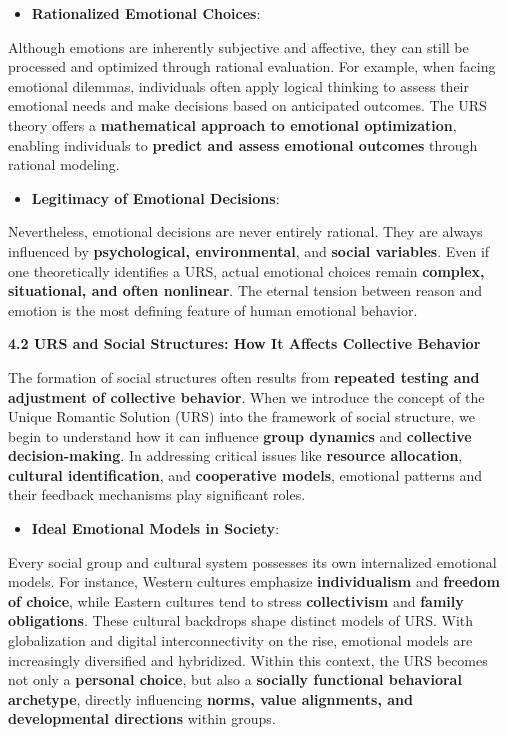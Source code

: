 \documentclass[a4paper]{article}
\begin{document}
\begin{itemize}[series=listWWNumix,label=[F0B7?]]
\item \textbf{Rationalized Emotional Choices}:
\end{itemize}
Although emotions are inherently subjective and affective, they can still be processed and optimized through rational
evaluation. For example, when facing emotional dilemmas, individuals often apply logical thinking to assess their
emotional needs and make decisions based on anticipated outcomes. The URS theory offers a \textbf{mathematical approach
to emotional optimization}, enabling individuals to \textbf{predict and assess emotional outcomes} through rational
modeling.

\begin{itemize}[resume*=listWWNumix]
\item \textbf{Legitimacy of Emotional Decisions}:
\end{itemize}
Nevertheless, emotional decisions are never entirely rational. They are always influenced by \textbf{psychological,
environmental}, and \textbf{social variables}. Even if one theoretically identifies a URS, actual emotional choices
remain \textbf{complex, situational, and often nonlinear}. The eternal tension between reason and emotion is the most
defining feature of human emotional behavior.

\textbf{4.2 URS and Social Structures: How It Affects Collective Behavior}

The formation of social structures often results from \textbf{repeated testing and adjustment of collective behavior}.
When we introduce the concept of the Unique Romantic Solution (URS) into the framework of social structure, we begin to
understand how it can influence \textbf{group dynamics} and \textbf{collective decision-making}. In addressing critical
issues like \textbf{resource allocation}, \textbf{cultural identification}, and \textbf{cooperative models}, emotional
patterns and their feedback mechanisms play significant roles.

\begin{itemize}[series=listWWNumx,label=[F0B7?]]
\item \textbf{Ideal Emotional Models in Society}: 
\end{itemize}
Every social group and cultural system possesses its own internalized emotional models. For instance, Western cultures
emphasize \textbf{individualism} and \textbf{freedom of choice}, while Eastern cultures tend to stress
\textbf{collectivism} and \textbf{family obligations}. These cultural backdrops shape distinct models of URS. With
globalization and digital interconnectivity on the rise, emotional models are increasingly diversified and hybridized.
Within this context, the URS becomes not only a \textbf{personal choice}, but also a \textbf{socially functional
behavioral archetype}, directly influencing \textbf{norms, value alignments, and developmental directions} within
groups.
\end{document}
